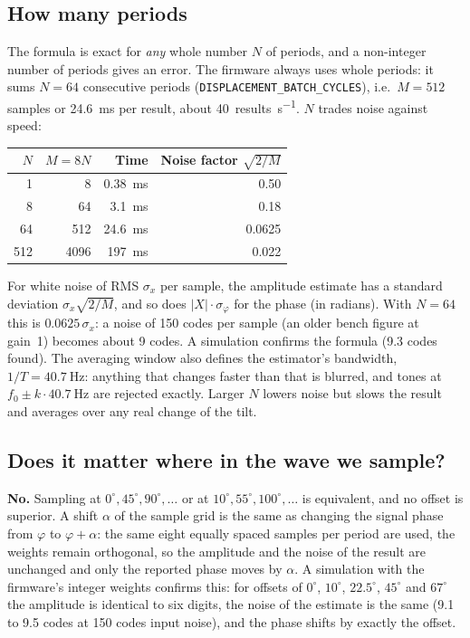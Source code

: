 \documentclass[11pt,a4paper]{article}
\begin{document}
\subsection{How many periods}

The formula is exact for \emph{any} whole number $N$ of periods, and a
non-integer number of periods gives an error.  The firmware always uses
whole periods: it sums $N=64$ consecutive periods (\texttt{DISPLACEMENT\_BATCH\_CYCLES}),
i.e.\ $M=512$ samples or \SI{24.6}{\milli\second} per result, about
\SI{40}{results\per\second}.  $N$ trades noise against speed:
\begin{center}
\small
\begin{tabular}{@{}rrrr@{}}
\toprule
$N$ & $M=8N$ & Time & Noise factor $\sqrt{2/M}$ \\
\midrule
1   & 8    & \SI{0.38}{\milli\second} & 0.50 \\
8   & 64   & \SI{3.1}{\milli\second}  & 0.18 \\
64  & 512  & \SI{24.6}{\milli\second} & 0.0625 \\
512 & 4096 & \SI{197}{\milli\second}  & 0.022 \\
\bottomrule
\end{tabular}
\end{center}
For white noise of RMS $\sigma_x$ per sample, the amplitude estimate has a
standard deviation $\sigma_x\sqrt{2/M}$, and so does $|X|\cdot\sigma_\varphi$
for the phase (in radians).  With $N=64$ this is $0.0625\,\sigma_x$: a
noise of 150 codes per sample (an older bench figure at gain~1) becomes about
9 codes.  A simulation confirms the formula (9.3 codes found).  The averaging
window also defines the estimator's bandwidth, $1/T=\SI{40.7}{\hertz}$: anything
that changes faster than that is blurred, and tones at
$f_0\pm k\cdot\SI{40.7}{\hertz}$ are rejected exactly.  Larger $N$ lowers
noise but slows the result and averages over any real change of the tilt.

\subsection{Does it matter where in the wave we sample?}

\textbf{No.}  Sampling at $0^\circ,45^\circ,90^\circ,\dots$ or at
$10^\circ,55^\circ,100^\circ,\dots$ is equivalent, and no offset is
superior.  A shift $\alpha$ of the sample grid is the same as changing the
signal phase from $\varphi$ to $\varphi+\alpha$: the same eight equally
spaced samples per period are used, the weights remain orthogonal, so the
amplitude and the noise of the result are unchanged and only the reported
phase moves by $\alpha$.  A simulation with the firmware's integer weights
confirms this: for offsets of $0^\circ$, $10^\circ$, $22.5^\circ$,
$45^\circ$ and $67^\circ$ the amplitude is identical to six digits, the noise
of the estimate is the same (9.1 to 9.5 codes at 150 codes input noise), and
the phase shifts by exactly the offset.
\end{document}
